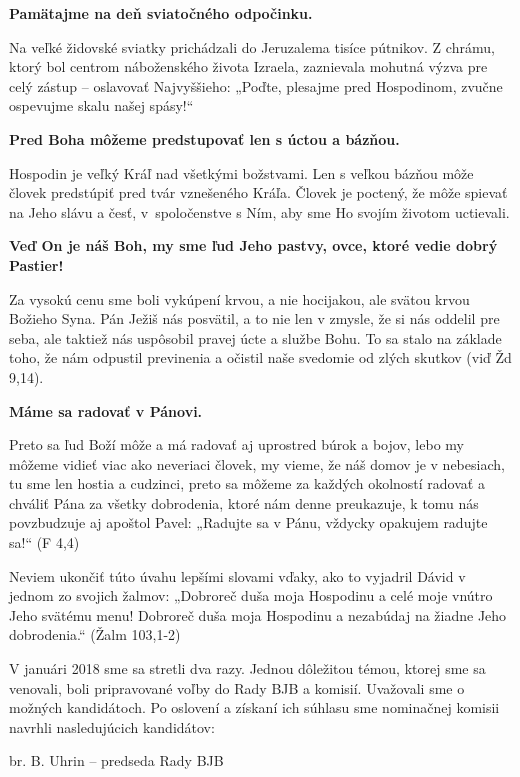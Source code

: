 {\bf Pamätajme na deň sviatočného odpočinku.}

Na veľké židovské sviatky prichádzali do Jeruzalema tisíce pútnikov. Z chrámu, ktorý bol centrom náboženského života Izraela, zaznievala mohutná výzva pre celý zástup -- oslavovať Najvyššieho: „Poďte, plesajme pred Hospodinom, zvučne ospevujme skalu našej spásy!“

{\bf Pred Boha môžeme predstupovať len s úctou a bázňou.}

Hospodin je veľký Kráľ nad všetkými božstvami. Len s veľkou bázňou môže človek predstúpiť pred tvár vznešeného Kráľa. Človek je poctený, že môže spievať na Jeho slávu a česť, v~spoločenstve s Ním, aby sme Ho svojím životom uctievali.

{\bf Veď On je náš Boh, my sme ľud Jeho pastvy, ovce, ktoré vedie dobrý Pastier!}

Za vysokú cenu sme boli vykúpení krvou, a nie hocijakou, ale svätou krvou Božieho Syna. Pán Ježiš nás posvätil, a to nie len v zmysle, že si nás oddelil pre seba, ale taktiež nás uspôsobil pravej úcte a službe Bohu. To sa stalo na základe toho, že nám odpustil previnenia a očistil naše svedomie od zlých skutkov (viď Žd 9,14).

{\bf Máme sa radovať v Pánovi.}

Preto sa ľud Boží môže a má radovať aj uprostred búrok a bojov, lebo my môžeme vidieť viac ako neveriaci človek, my vieme, že náš domov je v nebesiach, tu sme len hostia a cudzinci, preto sa môžeme za každých okolností radovať a chváliť Pána za všetky dobrodenia, ktoré nám denne preukazuje, k tomu nás povzbudzuje aj apoštol Pavel: „Radujte sa v Pánu, vždycky opakujem radujte sa!“ (F 4,4)

Neviem ukončiť túto úvahu lepšími slovami vďaky, ako to vyjadril Dávid v jednom zo svojich žalmov: „Dobroreč duša moja Hospodinu a celé moje vnútro Jeho svätému menu! Dobroreč duša moja Hospodinu a nezabúdaj na žiadne Jeho dobrodenia.“ (Žalm 103,1-2)


V januári 2018 sme sa stretli dva razy. Jednou dôležitou témou, ktorej sme sa venovali, boli pripravované voľby do Rady BJB a komisií. Uvažovali sme o možných kandidátoch. Po  oslovení a získaní ich súhlasu sme nominačnej komisii navrhli nasledujúcich kandidátov:

br. B. Uhrin – predseda Rady BJB

